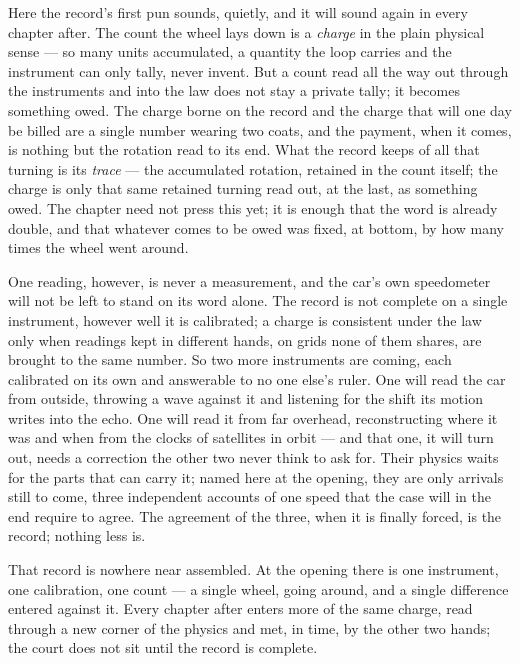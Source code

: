 Here the record's first pun sounds, quietly, and it will sound again in every chapter after. The count the
wheel lays down is a \emph{charge} in the plain physical sense --- so many units accumulated, a quantity the
loop carries and the instrument can only tally, never invent. But a count read all the way out through the
instruments and into the law does not stay a private tally; it becomes something owed. The charge borne on the
record and the charge that will one day be billed are a single number wearing two coats, and the payment, when
it comes, is nothing but the rotation read to its end. What the record keeps of all that turning is its
\emph{trace} --- the accumulated rotation, retained in the count itself; the charge is only that same retained
turning read out, at the last, as something owed. The chapter need not press this yet; it is enough that
the word is already double, and that whatever comes to be owed was fixed, at bottom, by how many times the wheel
went around.

One reading, however, is never a measurement, and the car's own speedometer will not be left to stand on its
word alone. The record is not complete on a single instrument, however well it is calibrated; a charge is
consistent under the law only when readings kept in different hands, on grids none of them shares, are brought
to the same number. So two more instruments are coming, each calibrated on its own and answerable to no one
else's ruler. One will read the car from outside, throwing a wave against it and listening for the shift its
motion writes into the echo. One will read it from far overhead, reconstructing where it was and when from the
clocks of satellites in orbit --- and that one, it will turn out, needs a correction the other two never think
to ask for. Their physics waits for the parts that can carry it; named here at the opening, they are only
arrivals still to come, three independent accounts of one speed that the case will in the end require to agree.
The agreement of the three, when it is finally forced, is the record; nothing less is.

That record is nowhere near assembled. At the opening there is one instrument, one calibration, one count --- a
single wheel, going around, and a single difference entered against it. Every chapter after enters more of the
same charge, read through a new corner of the physics and met, in time, by the other two hands; the court does
not sit until the record is complete.

